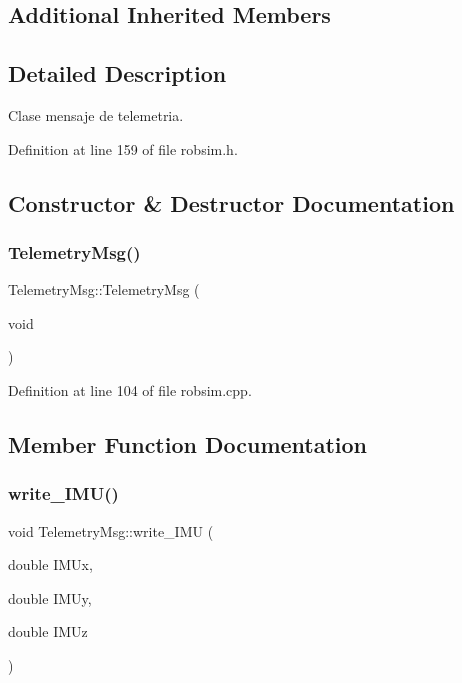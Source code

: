 \subsection*{Additional Inherited Members}


\subsection{Detailed Description}
Clase mensaje de telemetria. 

Definition at line 159 of file robsim.\+h.



\subsection{Constructor \& Destructor Documentation}
\mbox{\label{classTelemetryMsg_a930ff1a498097417aa25896e5ab92395}} 
\subsubsection{\texorpdfstring{Telemetry\+Msg()}{TelemetryMsg()}}
{\footnotesize\ttfamily Telemetry\+Msg\+::\+Telemetry\+Msg (\begin{DoxyParamCaption}\item[{void}]{ }\end{DoxyParamCaption})}



Definition at line 104 of file robsim.\+cpp.



\subsection{Member Function Documentation}
\mbox{\label{classTelemetryMsg_a9c4b738c7a5fdbbaba534160de4f0ef1}} 
\subsubsection{\texorpdfstring{write\+\_\+\+I\+M\+U()}{write\_IMU()}}
{\footnotesize\ttfamily void Telemetry\+Msg\+::write\+\_\+\+I\+MU (\begin{DoxyParamCaption}\item[{double}]{I\+M\+Ux,  }\item[{double}]{I\+M\+Uy,  }\item[{double}]{I\+M\+Uz }\end{DoxyParamCaption})}



